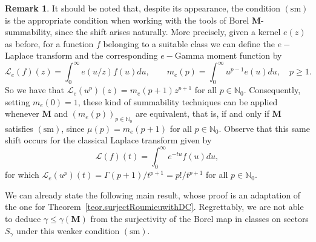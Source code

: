 \documentclass[11pt,a4paper]{article}
\theoremstyle{plain}
\theoremstyle{definition}
\newtheorem{remark}[theorem]{Remark}
\numberwithin{equation}{section}
\newcommand{\N}{\mathbb{N}}
\newcommand{\M}{{\boldsymbol{M}}}
\def\ga{\gamma}
\newcommand{\sm}{\operatorname{(sm)}}
\begin{document}
\begin{remark} It should be noted that, despite its appearance, the condition $\sm$ is the appropriate condition when working with the tools of Borel $\M$-summability, since the shift arises naturally. More precisely, given a kernel $e(z)$ as before, for a function $f$ belonging to a suitable class we can define the $e-$Laplace transform and the corresponding $e-$Gamma moment function by
$$\mathcal{L}_e (f) (z)=\int_{0}^\infty e(u/z) f(u) du, \qquad m_{e} (p) = \int_{0}^\infty u^{p-1} e(u) du,\quad  p\geq 1.$$
So we have that $\mathcal{L}_e (u^p) (z)= m_e(p+1) z^{p+1}$ for all $p\in\N_0$. Consequently, setting $m_e(0)=1$, these kind of summability techniques can be applied whenever $\M$ and $(m_{e}(p))_{p\in\N_0}$ are equivalent, that is, if and only if $\M$ satisfies $\sm$, since $\mu(p)= m_{e}(p+1)$ for all $p\in\N_0$. Observe that this same shift occurs for the classical Laplace transform given by
$$\mathcal{L}(f) (t)=\int_{0}^\infty e^{-tu} f(u) du,$$
for which  $\mathcal{L}_e (u^p) (t)= \Gamma(p+1)/t^{p+1} =p!/t^{p+1}$ for all $p\in\N_0$.
\end{remark}


We can already state the following main result, whose proof is an adaptation of the one for Theorem~\ref{teor.surjectRoumieuwithDC}. Regrettably, we are not able to deduce $\ga\le\ga(\M)$ from the surjectivity of the Borel map in classes on sectors $S_{\ga}$ under this weaker condition $\sm$.
\end{document}
